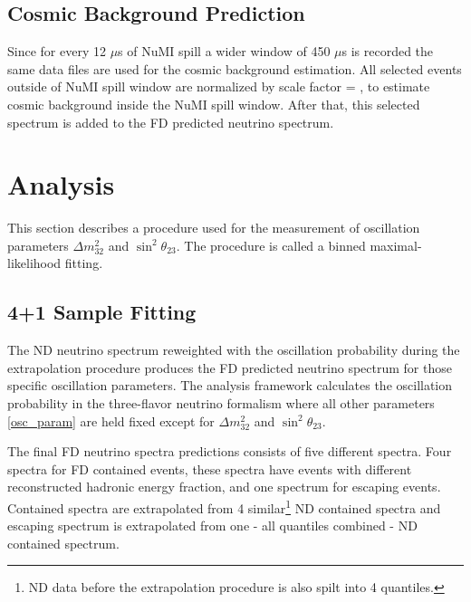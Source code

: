 \subsection{Cosmic Background Prediction}
Since for every 12 $\mu$s of NuMI spill a wider window of 450 $\mu$s is recorded the same data files
are used for the cosmic background estimation. All selected events outside of NuMI spill window are 
normalized by scale factor 
\be
{} = ,
\ee
to estimate cosmic background inside the NuMI spill window. After that, this selected spectrum is added 
to the FD predicted neutrino spectrum.

\section{Analysis}
This section describes a procedure used for the measurement of oscillation parameters $\Delta m^2_{32}$ 
and $\sin^2\theta_{23}$. The procedure is called a binned maximal-likelihood fitting.

\subsection{4+1 Sample Fitting}
The ND neutrino spectrum reweighted with the oscillation probability during the extrapolation procedure 
produces the FD predicted neutrino spectrum for those specific oscillation parameters. 
The analysis framework calculates the oscillation probability in the three-flavor neutrino formalism where all other
parameters \ref{osc_param} are held fixed except for $\Delta m^2_{32}$ and $\sin^2\theta_{23}$. 

The final FD neutrino spectra predictions consists of five different spectra. Four spectra for FD contained
events, these spectra have events with different reconstructed hadronic energy fraction, and one spectrum
for escaping events. Contained spectra are extrapolated from 4 similar\footnote{ND data before the extrapolation
procedure is also spilt into 4 quantiles.} ND contained spectra and escaping spectrum is extrapolated from 
one - all quantiles combined - ND contained spectrum.


